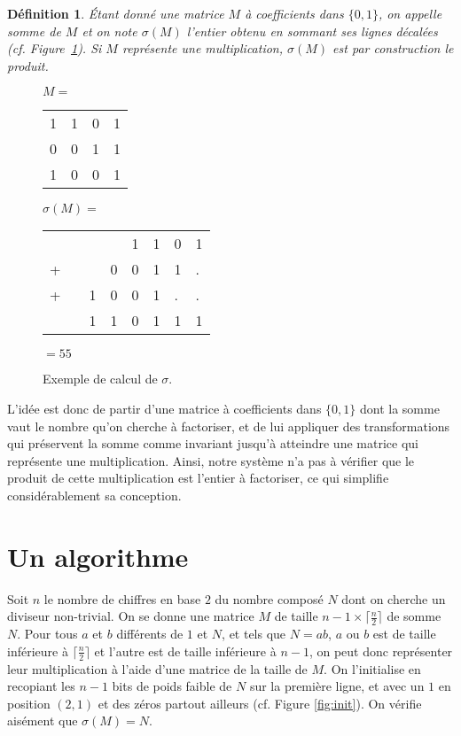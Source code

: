 \documentclass[11pt, openany]{article}
\newtheorem*{df*}{ \textbf{Définition}}{}
\begin{document}
\begin{df*}
Étant donné une matrice $M$ à coefficients dans $\{0,1\}$, on appelle \emph{somme} de $M$ et on note $\sigma (M)$ l'entier obtenu en sommant ses lignes décalées (cf. Figure~\ref{fig:ExSigma}). Si $M$ représente une multiplication, $\sigma(M)$ est par construction le produit. 
\end{df*}


\begin{figure}[]
\centering
\begin{minipage}[]{0.3\linewidth}
$M=$
\begin{tabular}{cccc}
1&1&0&1\\
0&0&1&1\\
1&0&0&1\\
\end{tabular}
\end{minipage}
\quad
\begin{minipage}[]{0.6\linewidth}
$\sigma(M)=$
\begin{tabular}{llllllll}
&&&&1&1&0&1\\
+&&&0&0&1&1&.\\
+&&1&0&0&1&.&.\\
\hline
&&1&1&0&1&1&1\\
\end{tabular}
$=55$
\end{minipage}
\caption{Exemple de calcul de $\sigma$.}
\label{fig:ExSigma}
\end{figure}

L'idée est donc de partir d'une matrice à coefficients dans $\{0,1\}$ dont la somme vaut le nombre qu'on cherche à factoriser, et de lui appliquer des transformations qui préservent la somme comme invariant jusqu'à atteindre une matrice qui représente une multiplication. Ainsi, notre système n'a pas à vérifier que le produit de cette multiplication est l'entier à factoriser, ce qui simplifie considérablement sa conception.

\section*{Un algorithme}

Soit $n$ le nombre de chiffres en base $2$ du nombre composé $N$ dont on cherche un diviseur non-trivial. On se donne une matrice $M$ de taille $ n-1 \times \lceil \frac{n}{2}\rceil$ de somme $N$. Pour tous $a$ et $b$ différents de $1$ et $N$, et tels que $N = ab$, $a$ ou $b$ est de taille inférieure à $\lceil\frac{n}{2}\rceil$ et l'autre est de taille inférieure à $n-1$, on peut donc représenter leur multiplication à l'aide d'une matrice de la taille de $M$. On l'initialise en recopiant les $n-1$ bits de poids faible de $N$ sur la première ligne, et avec un $1$ en position $(2,1)$ et des zéros partout ailleurs (cf. Figure \ref{fig:init}). On vérifie aisément que $\sigma(M)=N$. 
\end{document}
